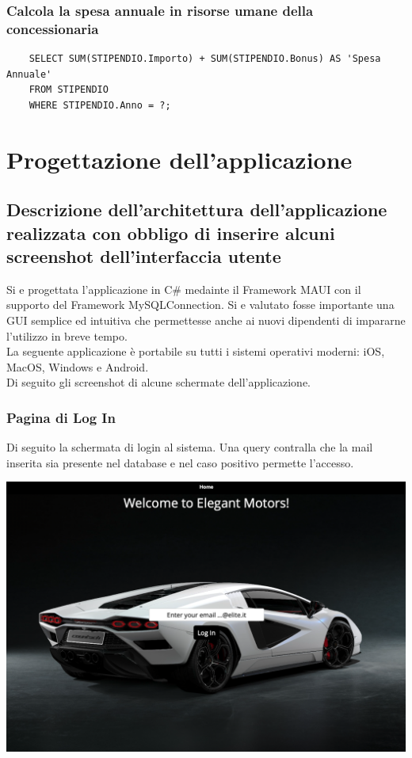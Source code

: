 \documentclass[11pt]{article}
\begin{document}
\subsubsection*{Calcola la spesa annuale in risorse umane della concessionaria}

\begin{lstlisting}
    SELECT SUM(STIPENDIO.Importo) + SUM(STIPENDIO.Bonus) AS 'Spesa Annuale'
    FROM STIPENDIO
    WHERE STIPENDIO.Anno = ?;
\end{lstlisting}

\section{Progettazione dell'applicazione}

\subsection{Descrizione dell'architettura dell'applicazione realizzata con
obbligo di inserire alcuni screenshot dell'interfaccia utente}

Si e progettata l'applicazione in C\# medainte il Framework MAUI con il supporto
del Framework MySQLConnection. Si e valutato fosse importante una GUI semplice
ed intuitiva che permettesse anche ai nuovi dipendenti di impararne l'utilizzo
in breve tempo.\\
La seguente applicazione è portabile su tutti i sistemi operativi moderni: iOS,
MacOS, Windows e Android.\\
Di seguito gli screenshot di alcune schermate dell'applicazione.

\subsubsection{Pagina di Log In}
Di seguito la schermata di login al sistema. Una query contralla che la mail
inserita sia presente nel database e nel caso positivo permette l'accesso.
\begin{center}
    \includegraphics[width=\linewidth]{images/app/logInPage.png}
\end{center}
\end{document}
